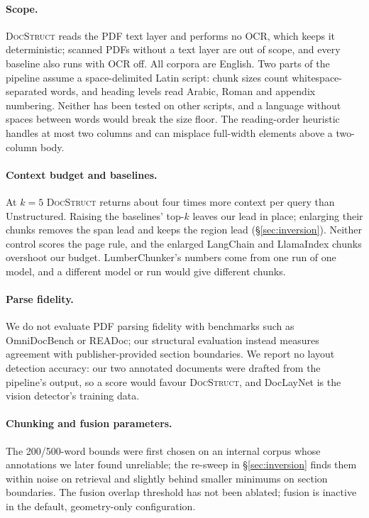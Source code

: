 \documentclass[11pt]{article}
\newcommand{\ds}{\textsc{DocStruct}}
\begin{document}
\paragraph{Scope.} \ds{} reads the PDF text layer and performs no OCR, which keeps it deterministic; scanned PDFs without a text layer are out of scope, and every baseline also runs with OCR off. All corpora are English. Two parts of the pipeline assume a space-delimited Latin script: chunk sizes count whitespace-separated words, and heading levels read Arabic, Roman and appendix numbering. Neither has been tested on other scripts, and a language without spaces between words would break the size floor. The reading-order heuristic handles at most two columns and can misplace full-width elements above a two-column body.

\paragraph{Context budget and baselines.} At $k{=}5$ \ds{} returns about four times more context per query than Unstructured. Raising the baselines' top-$k$ leaves our lead in place; enlarging their chunks removes the span lead and keeps the region lead (\S\ref{sec:inversion}). Neither control scores the page rule, and the enlarged LangChain and LlamaIndex chunks overshoot our budget. LumberChunker's numbers come from one run of one model, and a different model or run would give different chunks.

\paragraph{Parse fidelity.} We do not evaluate PDF parsing fidelity with benchmarks such as OmniDocBench or READoc; our structural evaluation instead measures agreement with publisher-provided section boundaries. We report no layout detection accuracy: our two annotated documents were drafted from the pipeline's output, so a score would favour \ds{}, and DocLayNet is the vision detector's training data.

\paragraph{Chunking and fusion parameters.} The 200/500-word bounds were first chosen on an internal corpus whose annotations we later found unreliable; the re-sweep in \S\ref{sec:inversion} finds them within noise on retrieval and slightly behind smaller minimums on section boundaries. The fusion overlap threshold has not been ablated; fusion is inactive in the default, geometry-only configuration.
\end{document}
